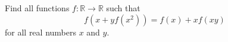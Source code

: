 Find all functions $f : \mathbb R\to\mathbb R $ such that \[f(x+yf(x^2))=f(x)+xf(xy)\]for all real numbers $x$ and $y$.